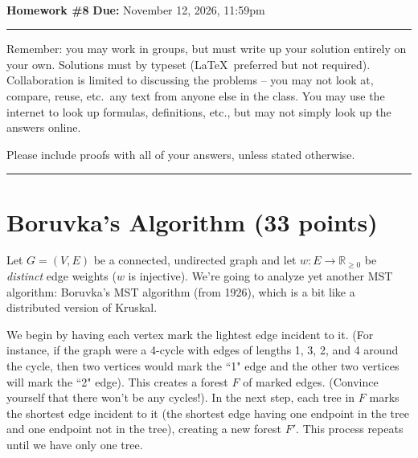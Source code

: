 \documentclass[11pt]{article}
\begin{document}
\\ 
{{\bf Homework \#8}} \hfill {{\bf Due:} November 12, 2026, 11:59pm} \\
\rule[0.1in]{\textwidth}{0.4pt}

Remember: you may work in groups, but must write up your solution entirely on your own. Solutions must by typeset (\LaTeX\ preferred but not required). 
Collaboration is limited to discussing the problems -- you may not look at, compare, reuse, etc.~any text from anyone else in the class. 
You may use the internet to look up formulas, definitions, etc., but may not simply look up the answers online.  

Please include proofs with all of your answers, unless stated otherwise.


\noindent \rule[0.1in]{\textwidth}{0.4pt}

\section{Boruvka's Algorithm (33 points)}

Let $G = (V, E)$ be a connected, undirected graph and let $w : E \rightarrow \mathbb{R}_{\geq 0}$ be \emph{distinct} edge weights ($w$ is injective). 
We're going to analyze yet another MST algorithm: Boruvka's MST algorithm (from 1926), which is a bit like a distributed version of Kruskal.

We begin by having each vertex mark the lightest edge incident to it. (For instance, if the graph were a 4-cycle with edges of lengths 1, 3, 2, and 4 
around the cycle, then two vertices would mark the ``1" edge and the other two vertices will mark the ``2" edge).  This creates a forest $F$ of marked edges. 
(Convince yourself that there won't be any cycles!). In the next step, each tree in $F$ marks the shortest edge incident to it 
(the shortest edge having one endpoint in the tree and one endpoint not in the tree), creating a new forest $F'$. 
This process repeats until we have only one tree.
\end{document}
